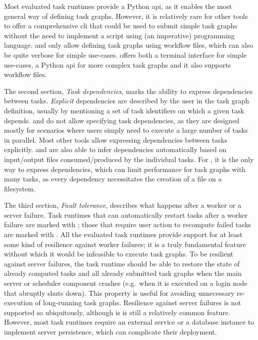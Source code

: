 Most evaluated task runtimes provide a Python \gls{api}, as it enables the most
general way of defining task graphs. However, it is relatively rare for other tools to offer a
comprehensive \gls{cli} that could be used to submit simple task graphs without the
need to implement a script using (an imperative) programming language. \merlin{} and
\autosubmit{} only allow defining task graphs using workflow files, which can also be
quite verbose for simple use-cases. \hyperqueue{} offers both a terminal interface for
simple use-cases, a Python \gls{api} for more complex task graphs and it also
supports workflow files.

The second section, \emph{Task dependencies}, marks the ability to express dependencies between
tasks. \emph{Explicit} dependencies are described by the user in the task graph definition,
usually by mentioning a set of task identifiers on which a given task depends.
\gnuparallel{} and \hypershell{} do not allow specifying task dependencies, as
they are designed mostly for scenarios where users simply need to execute a large number of tasks
in parallel. Most other tools allow expressing dependencies between tasks explicitly.
\pegasus{} and \snakemake{} are also able to infer dependencies
automatically based on input/output files consumed/produced by the individual tasks. For
\snakemake{}, it is the only way to express dependencies, which can limit performance
for task graphs with many tasks, as every dependency necessitates the creation of a file on a
filesystem.

The third section, \emph{Fault tolerance}, describes what happens after a worker or a server
failure. Task runtimes that can automatically restart tasks after a worker failure are marked with
\automaticft; those that require user action to recompute failed tasks are marked with \manualft.
All the evaluated task runtimes provide support for at least some kind of resilience against worker
failures; it is a truly fundamental feature without which it would be infeasible to execute task
graphs. To be resilient against server failures, the task runtime should be able to restore the
state of already computed tasks and all already submitted task graphs when the main server or
scheduler component crashes (e.g.\ when it is executed on a login node that abruptly shuts down).
This property is useful for avoiding unnecessary re-execution of long-running task graphs.
Resilience against server failures is not supported so ubiquitously, although is is still a
relatively common feature. However, most task runtimes require an external service or a database
instance to implement server persistence, which can complicate their deployment.

